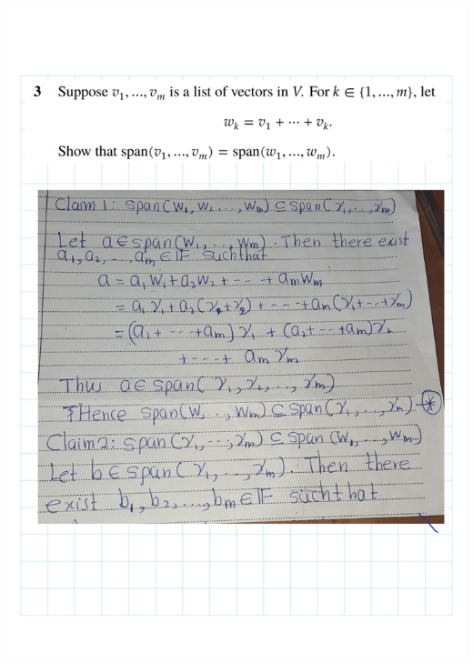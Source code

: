 \documentclass[
]{book}
\theoremstyle{definition}
\theoremstyle{definition}
\theoremstyle{definition}
\theoremstyle{definition}
\theoremstyle{remark}
\begin{document}
\includegraphics{fig/Ex2A/Ex2A-03.png}
\end{document}
